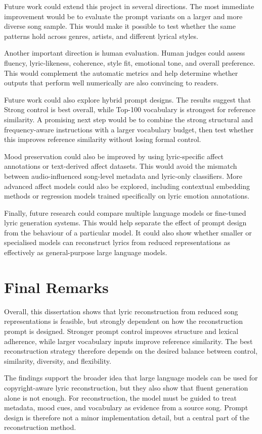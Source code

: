 Future work could extend this project in several directions. The most immediate improvement would be to evaluate the prompt variants on a larger and more diverse song sample. This would make it possible to test whether the same patterns hold across genres, artists, and different lyrical styles.

Another important direction is human evaluation. Human judges could assess fluency, lyric-likeness, coherence, style fit, emotional tone, and overall preference. This would complement the automatic metrics and help determine whether outputs that perform well numerically are also convincing to readers.

Future work could also explore hybrid prompt designs. The results suggest that Strong control is best overall, while Top-100 vocabulary is strongest for reference similarity. A promising next step would be to combine the strong structural and frequency-aware instructions with a larger vocabulary budget, then test whether this improves reference similarity without losing formal control.

Mood preservation could also be improved by using lyric-specific affect annotations or text-derived affect datasets. This would avoid the mismatch between audio-influenced song-level metadata and lyric-only classifiers. More advanced affect models could also be explored, including contextual embedding methods or regression models trained specifically on lyric emotion annotations.

Finally, future research could compare multiple language models or fine-tuned lyric generation systems. This would help separate the effect of prompt design from the behaviour of a particular model. It could also show whether smaller or specialised models can reconstruct lyrics from reduced representations as effectively as general-purpose large language models.

\section{Final Remarks}

Overall, this dissertation shows that lyric reconstruction from reduced song representations is feasible, but strongly dependent on how the reconstruction prompt is designed. Stronger prompt control improves structure and lexical adherence, while larger vocabulary inputs improve reference similarity. The best reconstruction strategy therefore depends on the desired balance between control, similarity, diversity, and flexibility.

The findings support the broader idea that large language models can be used for copyright-aware lyric reconstruction, but they also show that fluent generation alone is not enough. For reconstruction, the model must be guided to treat metadata, mood cues, and vocabulary as evidence from a source song. Prompt design is therefore not a minor implementation detail, but a central part of the reconstruction method.
